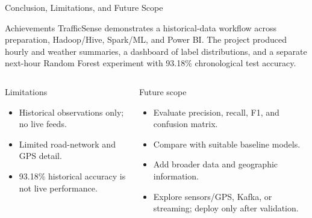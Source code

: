 \documentclass[aspectratio=169,11pt]{beamer}
\begin{document}
\begin{frame}[t]{Conclusion, Limitations, and Future Scope}
\vspace{-1mm}
\footnotesize
\begin{block}{Achievements}
TrafficSense demonstrates a historical-data workflow across preparation, Hadoop/Hive, Spark/ML, and Power BI. The project produced hourly and weather summaries, a dashboard of label distributions, and a separate next-hour Random Forest experiment with 93.18\% chronological test accuracy.
\end{block}

\vspace{2mm}

\begin{columns}[T,onlytextwidth]
\begin{alertblock}{Limitations}
\begin{minipage}[t][2.7cm][t]{\linewidth}
\begin{itemize}\itemsep0pt\parskip0pt
\item Historical observations only; no live feeds.
\item Limited road-network and GPS detail.
\item 93.18\% historical accuracy is not live performance.
\end{itemize}
\end{minipage}
\end{alertblock}
\begin{block}{Future scope}
\begin{minipage}[t][2.7cm][t]{\linewidth}
\begin{itemize}\itemsep0pt\parskip0pt
\item Evaluate precision, recall, F1, and confusion matrix.
\item Compare with suitable baseline models.
\item Add broader data and geographic information.
\item Explore sensors/GPS, Kafka, or streaming; deploy only after validation.
\end{itemize}
\end{minipage}
\end{block}
\end{columns}
\end{frame}
\end{document}
